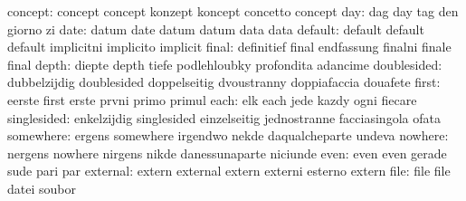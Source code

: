                   concept: concept                   concept
                           konzept                   koncept
                           concetto                  concept
                      day: dag                       day
                           tag                       den
                           giorno                    zi
                     date: datum                     date
                           datum                     datum
                           data                      data
                  default: default                   default
                           default                   implicitni
                           implicito                 implicit
                    final: definitief                final
                           endfassung                finalni
                           finale                    final
                    depth: diepte                    depth
                           tiefe                     podlehloubky
                           profondita                adancime
              doublesided: dubbelzijdig              doublesided
                           doppelseitig              dvoustranny
                           doppiafaccia              douafete
                    first: eerste                    first
                           erste                     prvni
                           primo                     primul
                     each: elk                       each
                           jede                      kazdy
                           ogni                      fiecare
              singlesided: enkelzijdig               singlesided
                           einzelseitig              jednostranne
                           facciasingola             ofata
                somewhere: ergens                    somewhere
                           irgendwo                  nekde
                           daqualcheparte            undeva
                  nowhere: nergens                   nowhere
                           nirgens                   nikde
                           danessunaparte            niciunde
                     even: even                      even
                           gerade                    sude
                           pari                      par
                 external: extern                    external
                           extern                    externi
                           esterno                   extern
                     file: file                      file
                           datei                     soubor
